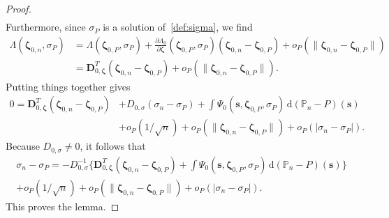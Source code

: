 \documentclass{article}
\numberwithin{equation}{section}
\theoremstyle{plain}
\newcommand{\dd}{\mathrm{d}}
\newcommand{\bzeta}{\bm\zeta}
\newcommand{\bD}{\mathbf{D}}
\begin{document}
\begin{proof}
\[\begin{split}
\end{split}
\]
Furthermore, since $\sigma_P$ is a solution of~\eqref{def:sigma}, we find
\[
\begin{split}
\Lambda(\bzeta_{0,n},\sigma_P)
&=
\Lambda(\bzeta_{0,P},\sigma_P)
+
\frac{\partial\Lambda_0}{\partial\bzeta}(\bzeta_{0,P},\sigma_P)(\bzeta_{0,n}-\bzeta_{0,P})
+
o_P(\|\bzeta_{0,n}-\bzeta_{0,P}\|)\\
&=
\bD_{0,\bzeta}^T(\bzeta_{0,n}-\bzeta_{0,P})
+
o_P(\|\bzeta_{0,n}-\bzeta_{0,P}\|).
\end{split}
\]
Putting things together gives
\[
\begin{split}
0
=
\bD_{0,\bzeta}^T(\bzeta_{0,n}-\bzeta_{0,P})
&+
D_{0,\sigma}
(\sigma_n-\sigma_P)
+
\int \Psi_0(\mathbf{s},\bzeta_{0,P},\sigma_P)\,\dd (\mathbb{P}_n-P)(\mathbf{s})\\
&+
o_P(1/\sqrt{n})
+
o_P(\|\bzeta_{0,n}-\bzeta_{0,P}\|)
+
o_P(|\sigma_n-\sigma_P|).
\end{split}
\]
Because $D_{0,\sigma}\ne0$, it follows that
\[
\begin{split}
\sigma_n-\sigma_P
=
-D_{0,\sigma}^{-1}
\bigg\{
\bD_{0,\bzeta}^T(\bzeta_{0,n}-\bzeta_{0,P})
+
\int \Psi_0(\mathbf{s},\bzeta_{0,P},\sigma_P)\,\dd (\mathbb{P}_n-P)(\mathbf{s})
\bigg\}\\
+
o_P(1/\sqrt{n})
+
o_P(\|\bzeta_{0,n}-\bzeta_{0,P}\|)
+
o_P(|\sigma_n-\sigma_P|).
\end{split}
\]
This proves the lemma.
\end{proof}
\end{document}

